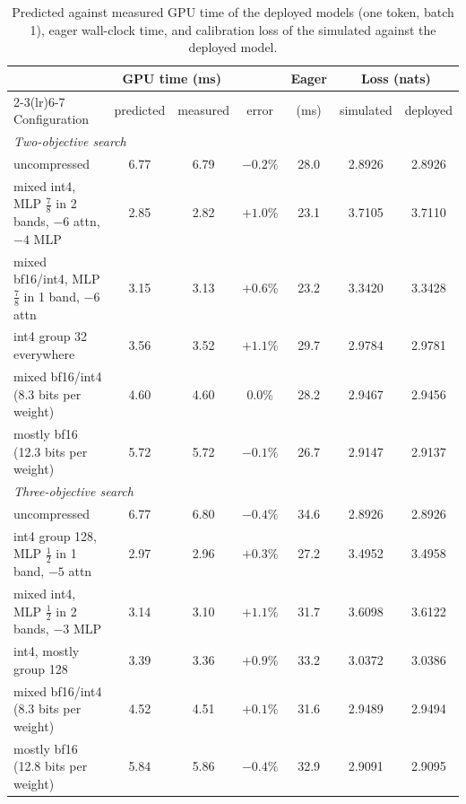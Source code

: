 \documentclass[11pt]{article}
\begin{document}
\begin{table}[htbp]
\centering
\footnotesize
\setlength{\tabcolsep}{4pt}
\begin{tabular}{lcccccc}
\toprule
& \multicolumn{2}{c}{GPU time (ms)} & & Eager & \multicolumn{2}{c}{Loss (nats)} \\
\cmidrule(lr){2-3}\cmidrule(lr){6-7}
Configuration & predicted & measured & error & (ms) & simulated & deployed \\
\midrule
\multicolumn{7}{l}{\textit{Two-objective search}} \\
  uncompressed                                         & 6.77 & 6.79 & $-0.2\%$ & 28.0 & 2.8926 & 2.8926 \\
  mixed int4, MLP $\tfrac78$ in 2 bands, $-6$ attn, $-4$ MLP & 2.85 & 2.82 & $+1.0\%$ & 23.1 & 3.7105 & 3.7110 \\
  mixed bf16/int4, MLP $\tfrac78$ in 1 band, $-6$ attn  & 3.15 & 3.13 & $+0.6\%$ & 23.2 & 3.3420 & 3.3428 \\
  int4 group 32 everywhere                              & 3.56 & 3.52 & $+1.1\%$ & 29.7 & 2.9784 & 2.9781 \\
  mixed bf16/int4 (8.3 bits per weight)                 & 4.60 & 4.60 & $0.0\%$  & 28.2 & 2.9467 & 2.9456 \\
  mostly bf16 (12.3 bits per weight)                    & 5.72 & 5.72 & $-0.1\%$ & 26.7 & 2.9147 & 2.9137 \\
\midrule
\multicolumn{7}{l}{\textit{Three-objective search}} \\
  uncompressed                                         & 6.77 & 6.80 & $-0.4\%$ & 34.6 & 2.8926 & 2.8926 \\
  int4 group 128, MLP $\tfrac12$ in 1 band, $-5$ attn   & 2.97 & 2.96 & $+0.3\%$ & 27.2 & 3.4952 & 3.4958 \\
  mixed int4, MLP $\tfrac12$ in 2 bands, $-3$ MLP       & 3.14 & 3.10 & $+1.1\%$ & 31.7 & 3.6098 & 3.6122 \\
  int4, mostly group 128                               & 3.39 & 3.36 & $+0.9\%$ & 33.2 & 3.0372 & 3.0386 \\
  mixed bf16/int4 (8.3 bits per weight)                 & 4.52 & 4.51 & $+0.1\%$ & 31.6 & 2.9489 & 2.9494 \\
  mostly bf16 (12.8 bits per weight)                    & 5.84 & 5.86 & $-0.4\%$ & 32.9 & 2.9091 & 2.9095 \\
\bottomrule
\end{tabular}
\caption{Predicted against measured GPU time of the deployed models (one token, batch 1), eager
wall-clock time, and calibration loss of the simulated against the deployed model.}
\label{tab:validation}
\end{table}
\end{document}

